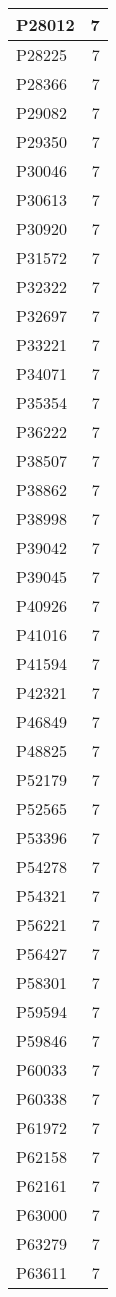 \documentclass[
]{book}
\theoremstyle{definition}
\theoremstyle{definition}
\theoremstyle{definition}
\theoremstyle{definition}
\theoremstyle{remark}
\begin{document}
\begin{table}
\begin{tabular}{l|r}
\hline
P28012 & 7\\
\hline
P28225 & 7\\
\hline
P28366 & 7\\
\hline
P29082 & 7\\
\hline
P29350 & 7\\
\hline
P30046 & 7\\
\hline
P30613 & 7\\
\hline
P30920 & 7\\
\hline
P31572 & 7\\
\hline
P32322 & 7\\
\hline
P32697 & 7\\
\hline
P33221 & 7\\
\hline
P34071 & 7\\
\hline
P35354 & 7\\
\hline
P36222 & 7\\
\hline
P38507 & 7\\
\hline
P38862 & 7\\
\hline
P38998 & 7\\
\hline
P39042 & 7\\
\hline
P39045 & 7\\
\hline
P40926 & 7\\
\hline
P41016 & 7\\
\hline
P41594 & 7\\
\hline
P42321 & 7\\
\hline
P46849 & 7\\
\hline
P48825 & 7\\
\hline
P52179 & 7\\
\hline
P52565 & 7\\
\hline
P53396 & 7\\
\hline
P54278 & 7\\
\hline
P54321 & 7\\
\hline
P56221 & 7\\
\hline
P56427 & 7\\
\hline
P58301 & 7\\
\hline
P59594 & 7\\
\hline
P59846 & 7\\
\hline
P60033 & 7\\
\hline
P60338 & 7\\
\hline
P61972 & 7\\
\hline
P62158 & 7\\
\hline
P62161 & 7\\
\hline
P63000 & 7\\
\hline
P63279 & 7\\
\hline
P63611 & 7\\

\end{tabular}
\end{table}
\end{document}
